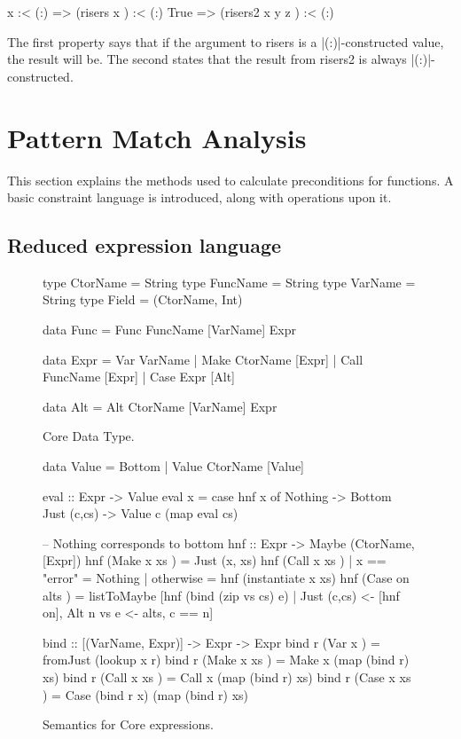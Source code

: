 \documentclass[preprint]{sigplanconf}
\newcommand{\C}[1]{\textsf{#1}}
\begin{document}
\begin{code}
x :< (:)  => (risers x       ) :< (:)
True      => (risers2 x y z  ) :< (:)
\end{code}

The first property says that if the argument to \C{risers} is a |(:)|-constructed value, the result will be. The second states that the result from \C{risers2} is always |(:)|-constructed.

\section{Pattern Match Analysis}
\label{sec:manipulate}

This section explains the methods used to calculate preconditions for functions. A basic constraint language is introduced, along with operations upon it.

\subsection{Reduced expression language}
\label{sec:core}

\begin{figure}
\begin{code}
type CtorName  =  String
type FuncName  =  String
type VarName   =  String
type Field     =  (CtorName, Int)

data Func  =  Func FuncName [VarName] Expr

data Expr  =  Var   VarName
           |  Make  CtorName  [Expr]
           |  Call  FuncName  [Expr]
           |  Case  Expr      [Alt]

data Alt   =  Alt CtorName [VarName] Expr
\end{code}
\caption{Core Data Type.}
\label{fig:core}
\end{figure}

\begin{figure}
\begin{code}
data Value = Bottom | Value CtorName [Value]

eval :: Expr -> Value
eval x = case  hnf x of
               Nothing      -> Bottom
               Just (c,cs)  -> Value c (map eval cs)

-- Nothing corresponds to bottom
hnf :: Expr -> Maybe (CtorName, [Expr])
hnf (Make  x   xs    )  =  Just (x, xs)
hnf (Call  x   xs    )  |  x == "error"  = Nothing 
                        |  otherwise     = hnf (instantiate x xs)
hnf (Case  on  alts  )  =  listToMaybe [hnf (bind (zip vs cs) e)
       | Just (c,cs) <- [hnf on], Alt n vs e <- alts, c == n]

bind :: [(VarName, Expr)] -> Expr -> Expr
bind r (Var   x     ) = fromJust (lookup x r)
bind r (Make  x xs  ) = Make  x (map (bind r) xs)
bind r (Call  x xs  ) = Call  x (map (bind r) xs)
bind r (Case  x xs  ) = Case (bind r x) (map (bind r) xs)
\end{code}
\caption{Semantics for Core expressions.}
\label{fig:semantics}
\end{figure}
\end{document}

